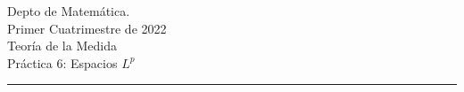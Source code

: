 \documentclass{book}
\newcommand{\rr}{\mathbb{R}}
\newcommand{\nn}{\mathbb{N}}
\begin{document}


\begin{large}
\begin{bfseries} %
        \noindent Depto de Matem\'atica.\\
        Primer Cuatrimestre de 2022\\                                                                                                                                                                                                                                                                                                                                                
        Teoría de la Medida \\
        Práctica 6: Espacios $L^p$

\end{bfseries}
\end{large}
\par\noindent\rule{\textwidth}{.5pt}












\end{document}
